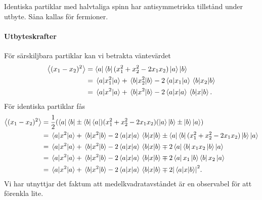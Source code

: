 Identiska partiklar med halvtaliga spinn har antisymmetriska tillstånd under utbyte. Såna kallas för fermioner.

\paragraph{Utbyteskrafter}
För särskiljbara partiklar kan vi betrakta väntevärdet
\begin{align*}
	\expval{(x_{1} - x_{2})^{2}} &= \bra{a}\bra{b}(x_{1}^{2} + x_{2}^{2} - 2x_{1}x_{2})\ket{a}\ket{b} \\
	                             &= \expval{x_{1}^{2}}{a} + \expval{x_{2}^{2}}{b} - 2\expval{x_{1}}{a}\expval{x_{2}}{b} \\
	                             &= \expval{x^{2}}{a} + \expval{x^{2}}{b} - 2\expval{x}{a}\expval{x}{b}.
\end{align*}
För identiska partiklar fås
\begin{align*}
	\expval{(x_{1} - x_{2})^{2}} &= \frac{1}{2}(\bra{a}\bra{b} \pm \bra{b}\bra{a})(x_{1}^{2} + x_{2}^{2} - 2x_{1}x_{2})(\ket{a}\ket{b} \pm \ket{b}\ket{a}) \\
	                             &= \expval{x^{2}}{a} + \expval{x^{2}}{b} - 2\expval{x}{a}\expval{x}{b} \pm \bra{a}\bra{b}(x_{1}^{2} + x_{2}^{2} - 2x_{1}x_{2})\ket{b}\ket{a} \\
	                             &= \expval{x^{2}}{a} + \expval{x^{2}}{b} - 2\expval{x}{a}\expval{x}{b} \mp 2\bra{a}\bra{b}x_{1}x_{2}\ket{b}\ket{a} \\
	                             &= \expval{x^{2}}{a} + \expval{x^{2}}{b} - 2\expval{x}{a}\expval{x}{b} \mp 2\bra{a}x_{1}\ket{b}\bra{b}x_{2}\ket{a} \\
	                             &= \expval{x^{2}}{a} + \expval{x^{2}}{b} - 2\expval{x}{a}\expval{x}{b} \mp 2\abs{\mel{a}{x}{b}}^{2}.
\end{align*}
Vi har utnyttjar det faktum att medelkvadratavståndet är en observabel för att förenkla lite.